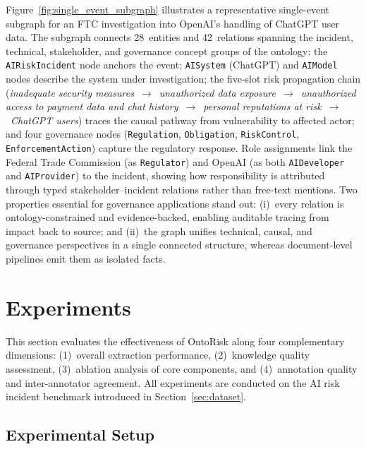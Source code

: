 \documentclass[a4paper,fleqn]{cas-dc}
\newcommand{\FILLME}[1]{\textcolor{red}{[#1]}}
\begin{document}
Figure~\ref{fig:single_event_subgraph} illustrates a representative
single-event subgraph for an FTC investigation into OpenAI's handling
of ChatGPT user data.
The subgraph connects 28~entities and 42~relations spanning the
incident, technical, stakeholder, and governance concept groups of
the ontology: the \texttt{AIRiskIncident} node anchors the event;
\texttt{AISystem} (ChatGPT) and \texttt{AIModel} nodes describe the
system under investigation; the five-slot risk propagation chain
(\textit{inadequate security measures}~$\to$~\textit{unauthorized
data exposure}~$\to$~\textit{unauthorized access to payment data
and chat history}~$\to$~\textit{personal reputations at risk}~$\to$~\textit{ChatGPT users}) traces the causal pathway from vulnerability
to affected actor; and four governance nodes
(\texttt{Regulation}, \texttt{Obligation}, \texttt{RiskControl},
\texttt{EnforcementAction}) capture the regulatory response.
Role assignments link the Federal Trade Commission (as
\texttt{Regulator}) and OpenAI (as both \texttt{AIDeveloper} and
\texttt{AIProvider}) to the incident, showing how responsibility is
attributed through typed stakeholder--incident relations rather than
free-text mentions.
Two properties essential for governance applications stand out:
(i)~every relation is ontology-constrained and evidence-backed,
enabling auditable tracing from impact back to source; and
(ii)~the graph unifies technical, causal, and governance perspectives
in a single connected structure, whereas document-level pipelines
emit them as isolated facts.


\section{Experiments}
\label{sec:experiments}

This section evaluates the effectiveness of OntoRisk along four
complementary dimensions: (1)~overall extraction performance,
(2)~knowledge quality assessment, (3)~ablation analysis of core
components, and (4)~annotation quality and inter-annotator
agreement.
All experiments are conducted on the AI risk incident benchmark
introduced in Section~\ref{sec:dataset}.

\subsection{Experimental Setup}
\label{sec:exp_setup}
\end{document}
